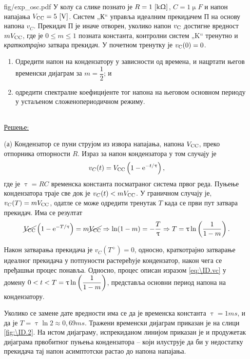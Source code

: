 \begin{slikaDesno}{fig/exp_osc.pdf}
\PID У колу са слике познато је 
$R = 1\,\left[\mathrm{k\Upomega}\right]$, $C=1\unit{\upmu F}$ и 
напон напајања $V_{\rm CC} = 5\,\left[\mathrm{V}\right]$.
Систем „К“ управља идеалним прекидачем П 
на основу напона $v_{C}$. Прекидач П је иначе 
отворен, уколико напон $v_{\rm C}$ достигне вредност 
$mV_{\rm CC}$, где је $0 \leq m \leq 1$ позната 
константа, контролни систем „K“ тренутно и 
\textit{краткотрајно} затвара прекидач. У почетном 
тренутку је $v_{\rm C}(0) = 0$. 
\begin{enumerate}[label=(\alph*)]
\item Одредити  напон 
на кондензатору у зависности од времена, и нацртати његов временски 
дијаграм за $m = \dfrac{1}{2}$; и
\item одредити спектралне коефицијенте 
тог напона на његовом основном периоду у устаљеном 
сложенопериодичном режиму. 
\end{enumerate}
\end{slikaDesno} \\


\underline{\sc Решење:} 

(а) Кондензатор се пуни струјом из извора напајања, напона $V_{\rm CC}$,  
преко отпорника отпорности $R$. Израз за напон кондензатора у том случају је 
\begin{equation}
v_{C}(t) = V_{\rm CC} \left(
    1 - \ee^{-t/\uptau} 
\right), \label{eq:\ID.vc}
\end{equation} где је $\uptau = RC$ временска константа посматраног система првог реда. Пуњење кондензатора траје
све док је $v_C(t) < m V_{\rm CC}$. У граничном случају је, 
$v_C(T) = m V_{\rm CC}$, одатле се може одредити тренутак $T$ када се први пут затвара прекидач. 
Има се резултат
\begin{equation}
    \cancel {V_{\rm CC}} \left(
    1 - {\rm e}^{-T/\uptau} \right) = m \cancel{V_{\rm CC}}
    \Rightarrow \ln(1 - m) = -\dfrac{T}{\uptau} \Rightarrow 
    T = \uptau \ln \left( \dfrac{1}{1 - m} \right).
\end{equation}

Након затварања прекидача је $v_{C}(T^+) = 0$, односно, краткотрајно затварање идеалног прекидача 
у потпуности растерећује кондензатор, након чега се пређашњи процес понавља. 
Односно, процес описан изразом \eqref{eq:\ID.vc} у домену 
$\displaystyle 0 < t < T = \uptau \ln \left( \dfrac{1}{1 - m} \right)$, представља основни период напона
на кондензатору. 

Уколико се замене дате вредности има се да је временска константа 
$\uptau = 1\unit{ms}$, и да је $T = \uptau \ln 2 \approx 0,69 \unit{ms}$. 
Тражени временски дијаграм приказан је на слици \ref{fig:\ID.2}. На истом дијаграму, испрекиданом
линијом приказан је и продужетак дијаграма првобитног пуњења кондензатора -- који илуструје да би 
у недостатку прекидача тај напон асимптотски растао до напона напајања. 

